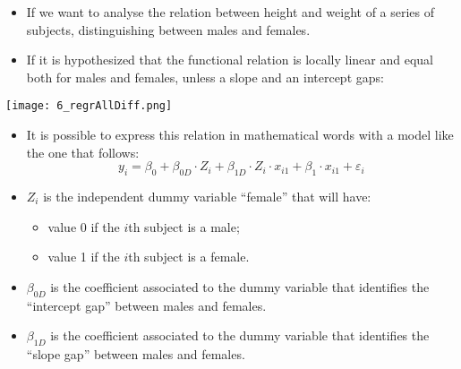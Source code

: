 
\begin{frame}
  \begin{itemize}
    \item If we want to analyse the relation between height and weight of a series of subjects, distinguishing between males and females. 
    \item If it is hypothesized that the functional relation is locally linear and equal both for males and females, unless a slope and an intercept gaps:
  \end{itemize}
  \begin{center}
    \texttt{[image: 6\_regrAllDiff.png]}
  \end{center}
\end{frame}

\begin{frame}
  \vspace*{.25cm}
  \begin{itemize}
    \item It is possible to express this relation in mathematical words with a model like the one that follows:
      \vspace{-0.3cm} $$ y_i = \beta_0 + \beta_{0D} \cdot Z_i + \beta_{1D} \cdot Z_i \cdot x_{i1} + \beta_1 \cdot x_{i1} + \varepsilon_i $$ 
    \item $Z_i$ is the independent dummy variable ``female'' that will have:
    \begin{itemize}
      \item value 0 if the $i$th subject is a male;
      \item value 1 if the $i$th subject is a female.
    \end{itemize}
    \vspace{0.2cm}\item $ \beta_{0D} $ is the coefficient associated to the dummy variable that identifies the ``intercept gap'' between males and females.
    \item $ \beta_{1D} $ is the coefficient associated to the dummy variable that identifies the ``slope gap'' between males and females.
  \end{itemize}
\end{frame}

